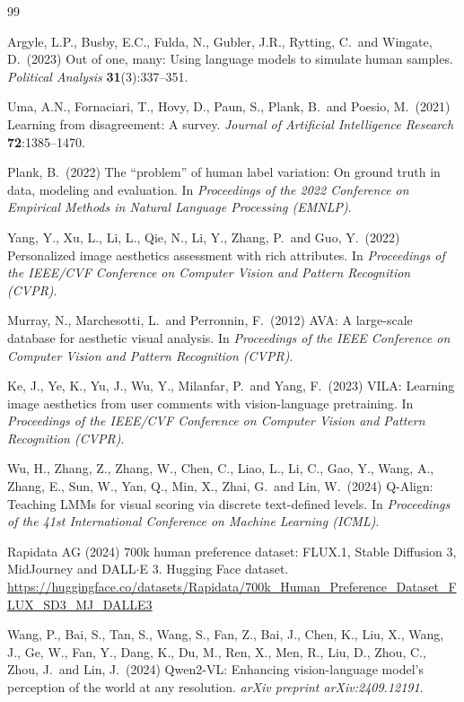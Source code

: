\documentclass[10pt,twocolumn,letterpaper]{article}
\begin{document}
\begingroup
\small
\begin{thebibliography}{99}

Argyle, L.P., Busby, E.C., Fulda, N., Gubler, J.R., Rytting, C.\ and Wingate, D.\ (2023)
Out of one, many: Using language models to simulate human samples.
{\it Political Analysis} {\bf 31}(3):337--351.

Uma, A.N., Fornaciari, T., Hovy, D., Paun, S., Plank, B.\ and Poesio, M.\ (2021)
Learning from disagreement: A survey.
{\it Journal of Artificial Intelligence Research} {\bf 72}:1385--1470.

Plank, B.\ (2022)
The ``problem'' of human label variation: On ground truth in data, modeling and evaluation.
In {\it Proceedings of the 2022 Conference on Empirical Methods in Natural Language Processing (EMNLP)}.

Yang, Y., Xu, L., Li, L., Qie, N., Li, Y., Zhang, P.\ and Guo, Y.\ (2022)
Personalized image aesthetics assessment with rich attributes.
In {\it Proceedings of the IEEE/CVF Conference on Computer Vision and Pattern Recognition (CVPR)}.

Murray, N., Marchesotti, L.\ and Perronnin, F.\ (2012)
AVA: A large-scale database for aesthetic visual analysis.
In {\it Proceedings of the IEEE Conference on Computer Vision and Pattern Recognition (CVPR)}.

Ke, J., Ye, K., Yu, J., Wu, Y., Milanfar, P.\ and Yang, F.\ (2023)
VILA: Learning image aesthetics from user comments with vision-language pretraining.
In {\it Proceedings of the IEEE/CVF Conference on Computer Vision and Pattern Recognition (CVPR)}.

Wu, H., Zhang, Z., Zhang, W., Chen, C., Liao, L., Li, C., Gao, Y., Wang, A., Zhang, E., Sun, W.,
Yan, Q., Min, X., Zhai, G.\ and Lin, W.\ (2024)
Q-Align: Teaching LMMs for visual scoring via discrete text-defined levels.
In {\it Proceedings of the 41st International Conference on Machine Learning (ICML)}.

Rapidata AG (2024)
700k human preference dataset: FLUX.1, Stable Diffusion 3, MidJourney and DALL$\cdot$E 3.
Hugging Face dataset.
\url{https://huggingface.co/datasets/Rapidata/700k_Human_Preference_Dataset_FLUX_SD3_MJ_DALLE3}

Wang, P., Bai, S., Tan, S., Wang, S., Fan, Z., Bai, J., Chen, K., Liu, X., Wang, J., Ge, W.,
Fan, Y., Dang, K., Du, M., Ren, X., Men, R., Liu, D., Zhou, C., Zhou, J.\ and Lin, J.\ (2024)
Qwen2-VL: Enhancing vision-language model's perception of the world at any resolution.
{\it arXiv preprint arXiv:2409.12191}.


\end{thebibliography}
\end{document}

